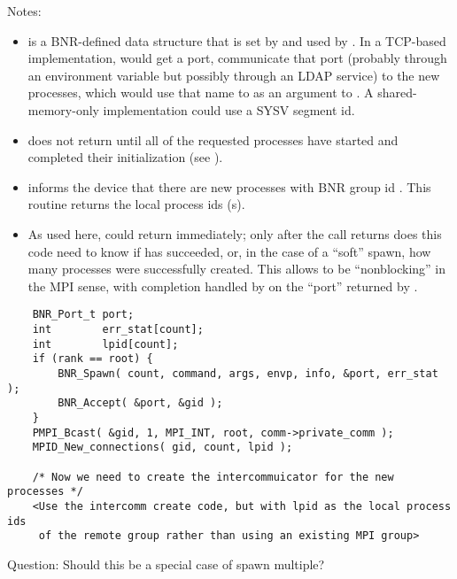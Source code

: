 \documentclass{article}
\begin{document}
Notes:
\begin{itemize}
\item {} is a BNR-defined data structure that is set by
   and used by .   In a TCP-based
  implementation,  would get a port, communicate that port
  (probably through an environment variable but possibly through an LDAP
  service) to the new processes, which would use that name to as an argument
  to .  A shared-memory-only implementation could use a
  SYSV segment id.

\item {} does not return until all of the requested
  processes have started and completed their initialization (see
  ).

\item {} informs the device that there are
   new processes with BNR group id .  This routine
  returns the local process ids (s).

\item As used here,  could return immediately; only after
  the  call returns does this code need to know if 
   has succeeded, or, in the case of a ``soft'' spawn, how
  many processes were successfully created.  This allows 
  to be ``nonblocking'' in the MPI sense, with completion handled by
   on the ``port'' returned by .

\end{itemize}

\begin{verbatim}
    BNR_Port_t port;
    int        err_stat[count];
    int        lpid[count];
    if (rank == root) {
        BNR_Spawn( count, command, args, envp, info, &port, err_stat );
        BNR_Accept( &port, &gid );
    }
    PMPI_Bcast( &gid, 1, MPI_INT, root, comm->private_comm );
    MPID_New_connections( gid, count, lpid );

    /* Now we need to create the intercommuicator for the new processes */
    <Use the intercomm create code, but with lpid as the local process ids
     of the remote group rather than using an existing MPI group>
\end{verbatim}

Question:  Should this be a special case of spawn multiple?

\subsubsection{}
\end{document}
